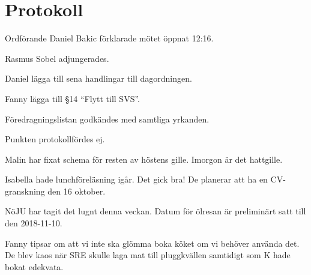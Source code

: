 \documentclass[10pt]{article}
\def\mo{Daniel Bakic}
\begin{document}
\section*{Protokoll}
\begin{paragrafer}
	Ordförande {\mo} förklarade mötet öppnat 12:16.
		
	{\valavmo}
		
	{\valavms}
		
	{\valavj}
		
	{\tosg}
		
	Rasmus Sobel adjungerades.

		
	
	Daniel \ypa lägga till sena handlingar till dagordningen.
	
	Fanny \ypa lägga till \S14 ``Flytt till SVS''.
	

	Föredragningslistan godkändes med samtliga yrkanden.
		

	\begin{fyllnadsval} %
	\end{fyllnadsval}
		
	\begin{paragrafer}
		Punkten protokollfördes ej.
				
		Malin har fixat schema för resten av höstens gille. Imorgon är det hattgille.

		Isabella hade lunchföreläsning igår. Det gick bra! De planerar att ha en CV-granskning den 16 oktober.

		NöJU har tagit det lugnt denna veckan. Datum för ölresan är preliminärt satt till den 2018-11-10. 

		Fanny tipsar om att vi inte ska glömma boka köket om vi behöver använda det. De blev kaos när SRE skulle laga mat till pluggkvällen samtidigt som K hade bokat edekvata.


\end{paragrafer}
\end{paragrafer}
\end{document}
